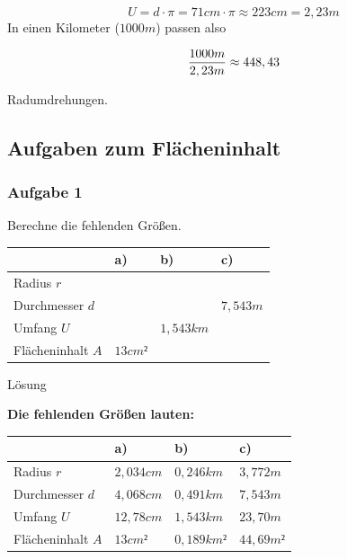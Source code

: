 \documentclass[
  ngerman,
]{book}
\begin{document}
\[U = d \cdot \pi =  71 cm \cdot \pi \approx 223cm = 2,23m\]
In einen Kilometer (\(1000m\)) passen also

\[{1000 m \over 2,23 m} \approx 448,43\]

Radumdrehungen.

\hypertarget{section-33}{%
\subsubsection*{}\label{section-33}}

\hypertarget{section-34}{%
\subsubsection*{}\label{section-34}}

\hypertarget{section-35}{%
\subsubsection*{}\label{section-35}}

\hypertarget{aufgaben-zum-fluxe4cheninhalt}{%
\subsection*{Aufgaben zum Flächeninhalt}\label{aufgaben-zum-fluxe4cheninhalt}}

\hypertarget{aufgabe-1-6}{%
\subsubsection*{Aufgabe 1}\label{aufgabe-1-6}}

Berechne die fehlenden Größen.

\begin{longtable}[]{@{}llll@{}}
\toprule
& a) & b) & c)\tabularnewline
\midrule
\endhead
Radius \(r\) & & &\tabularnewline
Durchmesser \(d\) & & & \(7,543m\)\tabularnewline
Umfang \(U\) & & \(1,543km\) &\tabularnewline
Flächeninhalt \(A\) & \(13cm²\) & &\tabularnewline
\bottomrule
\end{longtable}

Lösung

\textbf{Die fehlenden Größen lauten:}

\begin{longtable}[]{@{}llll@{}}
\toprule
& a) & b) & c)\tabularnewline
\midrule
\endhead
Radius \(r\) & \(2,034 cm\) & \(0,246 km\) & \(3,772 m\)\tabularnewline
Durchmesser \(d\) & \(4,068 cm\) & \(0,491 km\) & \(7,543m\)\tabularnewline
Umfang \(U\) & \(12,78 cm\) & \(1,543km\) & \(23,70 m\)\tabularnewline
Flächeninhalt \(A\) & \(13cm²\) & \(0,189 km²\) & \(44,69 m²\)\tabularnewline
\bottomrule
\end{longtable}
\end{document}
